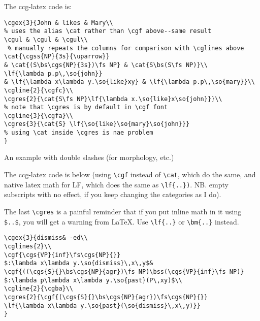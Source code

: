 \documentclass[11pt]{article}
\begin{document}
The ccg-latex code is:

\begin{verbatim}
\cgex{3}{John & likes & Mary\\ 
% uses the alias \cat rather than \cgf above--same result
\cgul & \cgul & \cgul\\ 
 % manually repeats the columns for comparison with \cglines above 
\cat{\cgss{NP}{3s}{\uparrow}} 
& \cat{(S\bs\cgs{NP}{3s})\fs NP} & \cat{S\bs(S\fs NP)}\\
\lf{\lambda p.p\,\so{john}} 
& \lf{\lambda x\lambda y.\so{like}xy} & \lf{\lambda p.p\,\so{mary}}\\
\cgline{2}{\cgfc}\\
\cgres{2}{\cat{S\fs NP}\lf{\lambda x.\so{like}x\so{john}}}\\  
% note that \cgres is by default in \cgf font
\cgline{3}{\cgfa}\\
\cgres{3}{\cat{S} \lf{\so{like}\so{mary}\so{john}}} 
% using \cat inside \cgres is nae problem
}
\end{verbatim}
\newpage

An example with double slashes (for morphology, etc.)\bigskip

\bigskip

The ccg-latex code is below (using \verb|\cgf| instead of \verb|\cat|, which do the same, and native latex math for LF, which does the  same as \verb|\lf{..})|. NB. empty subscripts with no effect, if you keep changing the categories as I do).

The last \verb|\cgres| is a painful reminder that if you put inline math
in it using \verb|$..$|, you will get a warning from \LaTeX. Use \verb|\lf{..}| or \verb|\bm{..}|  instead.\medskip

\begin{verbatim}
\cgex{3}{dismiss& -ed\\
\cglines{2}\\
\cgf{\cgs{VP}{inf}\fs\cgs{NP}{}}
$:\lambda x\lambda y.\so{dismiss}\,x\,y$&
\cgf{((\cgs{S}{}\bs\cgs{NP}{agr})\fs NP)\bss(\cgs{VP}{inf}\fs NP)}
$:\lambda p\lambda x\lambda y.\so{past}(P\,xy)$\\
\cgline{2}{\cgba}\\
\cgres{2}{\cgf{(\cgs{S}{}\bs\cgs{NP}{agr})\fs\cgs{NP}{}}
\lf{\lambda x\lambda y.\so{past}(\so{dismiss}\,x\,y)}}
}
\end{verbatim}
\newpage
\end{document}

